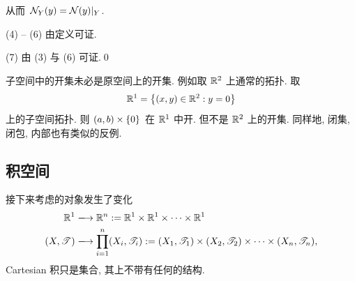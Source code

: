 \begin{Proof}
        从而 $ \mathcal{N}_{Y}(y)=\mathcal{N}(y)|_{Y} $.
        \begin{figure}[!htb]
            \centering
             \qquad
        \end{figure}

        (4) -- (6) 由定义可证.

        (7) 由 (3) 与 (6) 可证.\qed
    \end{Proof}
    
    \begin{Example}
        子空间中的开集未必是原空间上的开集. 例如取 $ \mathbb{R}^{2} $ 上通常的拓扑. 取
        \begin{align*}
            \mathbb{R}^{1}=\left\{ (x, y)\in\mathbb{R}^{2}: y=0 \right\}
        \end{align*}
        上的子空间拓扑. 则 $ (a, b)\times\left\{ 0 \right\} $ 在 $ \mathbb{R}^{1} $ 中开. 但不是 $ \mathbb{R}^{2} $ 上的开集. 同样地, 闭集, 闭包, 内部也有类似的反例.
    \end{Example}

\subsection{积空间}
    接下来考虑的对象发生了变化
    \begin{align*}
        \R^{1} & \xlongrightarrow{} \R^{n}:=\R^{1}\times\R^{1}\times\dots\times\R^{1}\\
        (X, \ST) & \xlongrightarrow{} \Prod{i=1}{n}(X_{i}, \ST_{i}):=(X_{1}, \ST_{1})\times(X_{2}, \ST_{2})\times\dotsb\times(X_{n}, \ST_{n}),
    \end{align*}
    Cartesian 积只是集合, 其上不带有任何的结构. 

